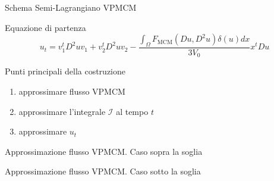 \begin{frame}{Schema Semi-Lagrangiano VPMCM}
  \begin{block}{Equazione di partenza}
    \[
    u_t=v_1^tD^2uv_1+v_2^tD^2uv_2 - \frac{\int_{\Omega}F_{\text{MCM}}(Du,D^2u)\delta(u)dx}{3V_0}x^tDu
    \]
  \end{block}
  \begin{block}{Punti principali della costruzione}
    \begin{enumerate}
    \item approssimare flusso VPMCM
    \item approssimare l'integrale $\mathcal{I}$ al tempo $t$
    \item approssimare $u_t$
    \end{enumerate}
  \end{block}
\end{frame}

\begin{frame}{Approssimazione flusso VPMCM. Caso sopra la soglia}

\end{frame}

\begin{frame}{Approssimazione flusso VPMCM. Caso sotto la soglia}

\end{frame}


